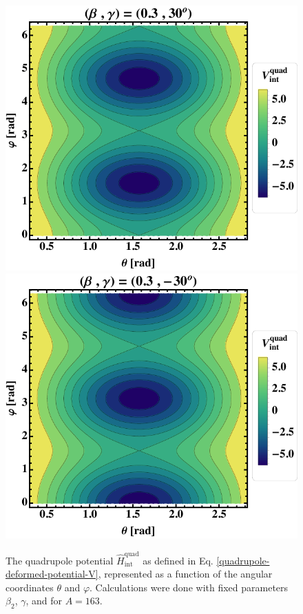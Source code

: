 \begin{figure}
    \centering
    \includegraphics[scale=0.66]{Chapters/Figures/quadrupole-potentialV-3.pdf}
    \includegraphics[scale=0.66]{Chapters/Figures/quadrupole-potentialV-4.pdf}
    \caption{The quadrupole potential $\hat{H}_\text{int}^\text{quad}$ as defined in Eq. \ref{quadrupole-deformed-potential-V}, represented as a function of the angular coordinates $\theta$ and $\varphi$. Calculations were done with fixed parameters $\beta_2$, $\gamma$, and for $A=163$.}
    \label{figs-deformed-quadrupole-potential-2}
\end{figure}

